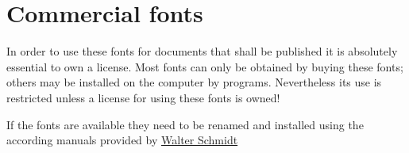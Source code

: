 \section{Commercial fonts}
\label{sec:doc:fonts:commercial}

In order to use these fonts for documents that shall be published it is absolutely essential to own a license. Most fonts can only be obtained by buying these fonts; others may be installed on the computer by programs. Nevertheless its use is restricted unless a license for using these fonts is owned!

If the fonts are available they need to be renamed and installed using the according manuals provided by \href{http://cq131a.de/fonts.html}{Walter Schmidt}

